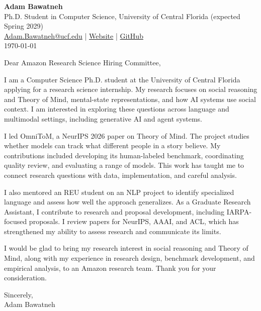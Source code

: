 \documentclass[11pt]{article}
\begin{document}
\textbf{Adam Bawatneh}\\
Ph.D. Student in Computer Science, University of Central Florida (expected Spring 2029)\\
\href{mailto:Adam.Bawatneh@ucf.edu}{Adam.Bawatneh@ucf.edu} \;|\;
\href{https://adam-12-0.github.io/}{Website} \;|\;
\href{https://github.com/Adam-12-0}{GitHub}\\[1em]
\today

\vspace{0.5em}
Dear Amazon Research Science Hiring Committee,

I am a Computer Science Ph.D. student at the University of Central Florida applying for a research science internship. My research focuses on social reasoning and Theory of Mind, mental-state representations, and how AI systems use social context. I am interested in exploring these questions across language and multimodal settings, including generative AI and agent systems.

I led OmniToM, a NeurIPS 2026 paper on Theory of Mind. The project studies whether models can track what different people in a story believe. My contributions included developing its human-labeled benchmark, coordinating quality review, and evaluating a range of models. This work has taught me to connect research questions with data, implementation, and careful analysis.

I also mentored an REU student on an NLP project to identify specialized language and assess how well the approach generalizes. As a Graduate Research Assistant, I contribute to research and proposal development, including IARPA-focused proposals. I review papers for NeurIPS, AAAI, and ACL, which has strengthened my ability to assess research and communicate its limits.

I would be glad to bring my research interest in social reasoning and Theory of Mind, along with my experience in research design, benchmark development, and empirical analysis, to an Amazon research team. Thank you for your consideration.

Sincerely,\\[0.5em]
Adam Bawatneh
\end{document}
